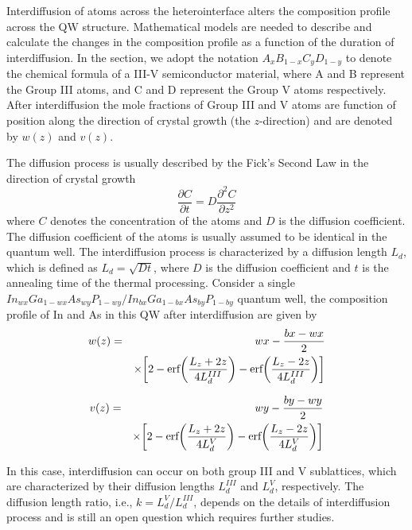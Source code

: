 Interdiffusion of atoms across the heterointerface alters the
composition profile across the QW structure. Mathematical models are
needed to describe and calculate the changes in the composition
profile as a function of the duration of interdiffusion. In the
section, we adopt the notation $A_{x}B_{1-x}C_{y}D_{1-y}$ to denote
the chemical formula of a III-V semiconductor material, where A and
B represent the Group III atoms, and C and D represent the Group V
atoms respectively. After interdiffusion the mole fractions of Group
III and V atoms are function of position along the direction of
crystal growth (the $z$-direction) and are denoted by $w(z)$ and
$v(z)$.

The diffusion process is usually described by the Fick's Second Law
in the direction of crystal growth
\begin{equation}
\frac{\partial{C}}{\partial{t}}=D\frac{\partial^2{C}}{\partial{z^2}}
\end{equation}
where $C$ denotes the concentration of the atoms and $D$ is the
diffusion coefficient. The diffusion coefficient of the atoms is
usually assumed to be identical in the quantum well. The
interdiffusion process is characterized by a diffusion length $L_d$,
which is defined as $L_d=\sqrt{Dt}$, where $D$ is the diffusion
coefficient and $t$ is the annealing time of the thermal processing.
Consider a single
$In_{wx}Ga_{1-wx}As_{wy}P_{1-wy}/In_{bx}Ga_{1-bx}As_{by}P_{1-by}$
quantum well, the composition profile of In and As in this QW after
interdiffusion are given by
\begin{eqnarray}
    w(z)&=&wx-\frac{bx-wx}{2} \notag\\
        &&\times \biggr[2-\textrm{erf}\biggr(\frac{L_z+2z}{4L_d^{III}}\biggr)
        -\textrm{erf}\biggr(\frac{L_z-2z}{4L_d^{III}}\biggr)\biggr]
\end{eqnarray}

\begin{eqnarray}
    v(z)&=&wy-\frac{by-wy}{2} \notag\\
        &&\times \biggr[2-\textrm{erf}\biggr(\frac{L_z+2z}{4L_d^{V}}\biggr)
        -\textrm{erf}\biggr(\frac{L_z-2z}{4L_d^{V}}\biggr)\biggr]
\end{eqnarray}

In this case, interdiffusion can occur on both group III and V
sublattices, which are characterized by their diffusion lengths
$L_d^{III}$ and $L_d^V$, respectively. The diffusion length ratio,
i.e., $k=L_d^V/L_d^{III}$, depends on the details of interdiffusion
process and is still an open question which requires further
studies.

